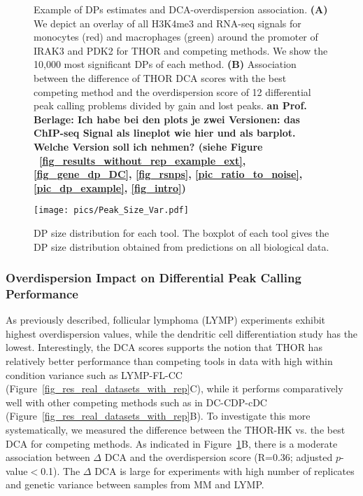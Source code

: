 \begin{figure}[th]
  \begin{center}
  \end{center}
\caption[Example of DPs in biological data and DCA-overdispersion association]{Example of DPs estimates and DCA-overdispersion association. \textbf{(A)} We depict an overlay of all H3K4me3 and RNA-seq signals for monocytes (red) and macrophages (green) around the promoter of IRAK3 and PDK2 for THOR and competing methods. We show the 10,000 most significant DPs of each method. \textbf{(B)} Association between the difference of THOR DCA scores with the best competing method and the overdispersion score of 12 differential peak calling problems divided by gain and lost peaks.
\textbf{an Prof. Berlage: Ich habe bei den plots je zwei Versionen: das ChIP-seq Signal als lineplot wie hier und als barplot. Welche Version soll ich nehmen? (siehe Figure ~\ref{fig_results_without_rep_example_ext}, \ref{fig_gene_dp_DC}, \ref{fig_rsnps}, \ref{pic_ratio_to_noise}, \ref{pic_dp_example}, \ref{fig_intro})}}
\label{fig_overdispersion_thor}
\end{figure}


\begin{figure}[th]
  \begin{center}
    \texttt{[image: pics/Peak\_Size\_Var.pdf]}
  \end{center}
\caption[Differential peak size distributions]{DP size distribution for each tool. 
The boxplot of each tool gives the DP size distribution obtained from predictions on all biological data.}
\label{fig_peak_size_distr}
\end{figure}

 
 
\subsubsection{Overdispersion Impact on Differential Peak Calling Performance}
As previously described, follicular lymphoma (LYMP) experiments exhibit highest overdispersion values, while the dendritic cell differentiation study has the lowest. 
Interestingly, the DCA scores supports the notion that THOR has relatively better performance than competing tools in data with high within condition variance such as LYMP-FL-CC (Figure~\ref{fig_res_real_datasets_with_rep}C), while it performs comparatively well with other competing methods such as in DC-CDP-cDC (Figure~\ref{fig_res_real_datasets_with_rep}B). 
To investigate this more systematically, we measured the difference between the THOR-HK vs. the best DCA for competing methods. 
As indicated in Figure~\ref{fig_overdispersion_thor}B, there is a moderate association between $\Delta$ DCA and the overdispersion score (R=0.36; adjusted $p$-value$<$0.1). 
The $\Delta$ DCA is large for experiments with high number of replicates and genetic variance between samples from MM and LYMP.  

